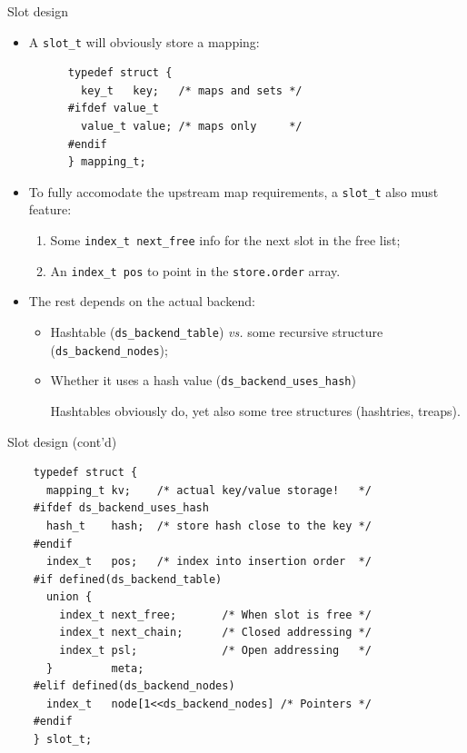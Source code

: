 \begin{frame}[fragile]{Slot design}

  \begin{itemize}
  \item A \lstinline{slot_t} will obviously store a mapping:
    \begin{lstlisting}
      typedef struct {
        key_t   key;   /* maps and sets */
      #ifdef value_t
        value_t value; /* maps only     */
      #endif
      } mapping_t;
    \end{lstlisting}
  \item To fully accomodate the upstream map requirements, a \lstinline{slot_t} also must feature:
    \begin{enumerate}
    \item Some \lstinline{index_t next_free} info for the next slot in the free list;
    \item An \lstinline{index_t pos} to point in the \lstinline{store.order} array.
    \end{enumerate}
  \item The rest depends on the actual backend:
    \begin{itemize}
    \item Hashtable (\lstinline{ds_backend_table}) {\em vs.} some recursive structure (\lstinline{ds_backend_nodes});
    \item Whether it uses a hash value (\lstinline{ds_backend_uses_hash})

      Hashtables obviously do, yet also some tree structures (hashtries, treaps).
    \end{itemize}
  \end{itemize}
  
\end{frame}


\begin{frame}[fragile]{Slot design (cont'd)}

  \begin{lstlisting}
    typedef struct {
      mapping_t kv;    /* actual key/value storage!   */
    #ifdef ds_backend_uses_hash
      hash_t    hash;  /* store hash close to the key */
    #endif
      index_t   pos;   /* index into insertion order  */
    #if defined(ds_backend_table)
      union {
        index_t next_free;       /* When slot is free */
        index_t next_chain;      /* Closed addressing */
        index_t psl;             /* Open addressing   */
      }         meta;
    #elif defined(ds_backend_nodes)
      index_t   node[1<<ds_backend_nodes] /* Pointers */
    #endif
    } slot_t;
  \end{lstlisting}
  
\end{frame}


